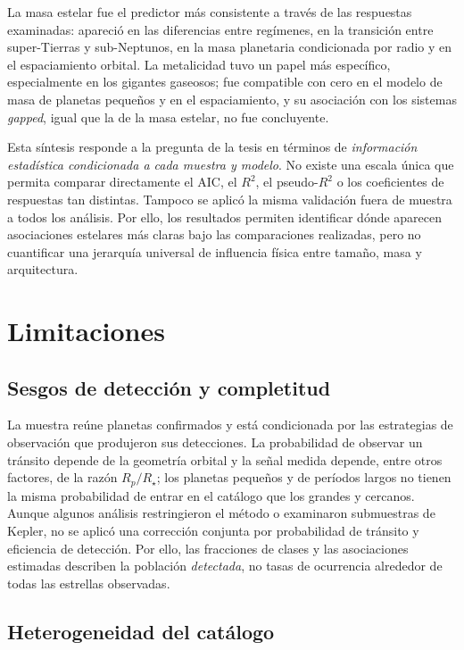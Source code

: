 La masa estelar fue el predictor más consistente a través de las respuestas examinadas: apareció en las diferencias entre regímenes, en la transición entre super-Tierras y sub-Neptunos, en la masa planetaria condicionada por radio y en el espaciamiento orbital. La metalicidad tuvo un papel más específico, especialmente en los gigantes gaseosos; fue compatible con cero en el modelo de masa de planetas pequeños y en el espaciamiento, y su asociación con los sistemas \textit{gapped}, igual que la de la masa estelar, no fue concluyente.

Esta síntesis responde a la pregunta de la tesis en términos de \emph{información estadística condicionada a cada muestra y modelo}. No existe una escala única que permita comparar directamente el AIC, el $R^2$, el pseudo-$R^2$ o los coeficientes de respuestas tan distintas. Tampoco se aplicó la misma validación fuera de muestra a todos los análisis. Por ello, los resultados permiten identificar dónde aparecen asociaciones estelares más claras bajo las comparaciones realizadas, pero no cuantificar una jerarquía universal de influencia física entre tamaño, masa y arquitectura.

\section{Limitaciones}
\label{sec:dis-limitaciones}

\subsection{Sesgos de detección y completitud}
\label{sec:dis-sesgos}

La muestra reúne planetas confirmados y está condicionada por las estrategias de observación que produjeron sus detecciones. La probabilidad de observar un tránsito depende de la geometría orbital y la señal medida depende, entre otros factores, de la razón $R_p/R_\star$; los planetas pequeños y de períodos largos no tienen la misma probabilidad de entrar en el catálogo que los grandes y cercanos. Aunque algunos análisis restringieron el método o examinaron submuestras de Kepler, no se aplicó una corrección conjunta por probabilidad de tránsito y eficiencia de detección. Por ello, las fracciones de clases y las asociaciones estimadas describen la población \emph{detectada}, no tasas de ocurrencia alrededor de todas las estrellas observadas.

\subsection{Heterogeneidad del catálogo}
\label{sec:dis-catalogo}

